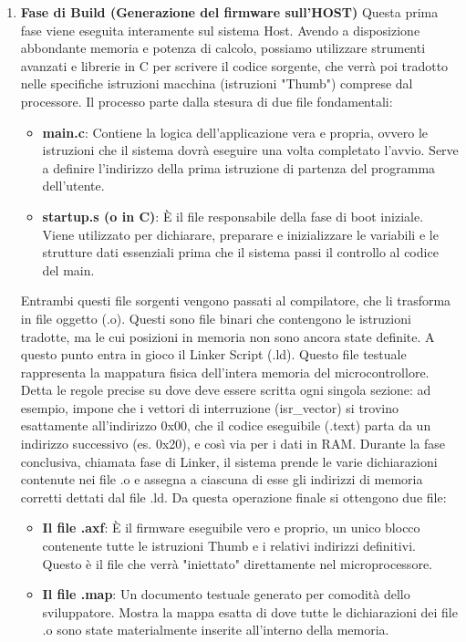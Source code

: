 \begin{enumerate}

    \item \textbf{Fase di Build (Generazione del firmware sull'HOST)}
    Questa prima fase viene eseguita interamente sul sistema Host. Avendo a disposizione abbondante memoria e potenza di calcolo, possiamo utilizzare strumenti avanzati e librerie in C per scrivere il codice sorgente, che verrà poi tradotto nelle specifiche istruzioni macchina (istruzioni "Thumb") comprese dal processore.
    \vspace{0.3cm}
    Il processo parte dalla stesura di due file fondamentali:
    \begin{itemize}
        \item \textbf{main.c}: Contiene la logica dell'applicazione vera e propria, ovvero le istruzioni che il sistema dovrà eseguire una volta completato l'avvio. Serve a definire l'indirizzo della prima istruzione di partenza del programma dell'utente.
        \item \textbf{startup.s (o in C)}: È il file responsabile della fase di boot iniziale. Viene utilizzato per dichiarare, preparare e inizializzare le variabili e le strutture dati essenziali prima che il sistema passi il controllo al codice del main.
    \end{itemize}

    Entrambi questi file sorgenti vengono passati al compilatore, che li trasforma in file oggetto (.o). Questi sono file binari che contengono le istruzioni tradotte, ma le cui posizioni in memoria non sono ancora state definite.
    \vspace{0.3cm}
    A questo punto entra in gioco il Linker Script (.ld). Questo file testuale rappresenta la mappatura fisica dell'intera memoria del microcontrollore. Detta le regole precise su dove deve essere scritta ogni singola sezione: ad esempio, impone che i vettori di interruzione (isr\_vector) si trovino esattamente all'indirizzo 0x00, che il codice eseguibile (.text) parta da un indirizzo successivo (es. 0x20), e così via per i dati in RAM.
    \vspace{0.3cm}
    Durante la fase conclusiva, chiamata fase di Linker, il sistema prende le varie dichiarazioni contenute nei file .o e assegna a ciascuna di esse gli indirizzi di memoria corretti dettati dal file .ld.
    Da questa operazione finale si ottengono due file:

    \begin{itemize}
        \item \textbf{Il file .axf}: È il firmware eseguibile vero e proprio, un unico blocco contenente tutte le istruzioni Thumb e i relativi indirizzi definitivi. Questo è il file che verrà "iniettato" direttamente nel microprocessore.
        \item \textbf{Il file .map}: Un documento testuale generato per comodità dello sviluppatore. Mostra la mappa esatta di dove tutte le dichiarazioni dei file .o sono state materialmente inserite all'interno della memoria.
    \end{itemize}




\end{enumerate}
